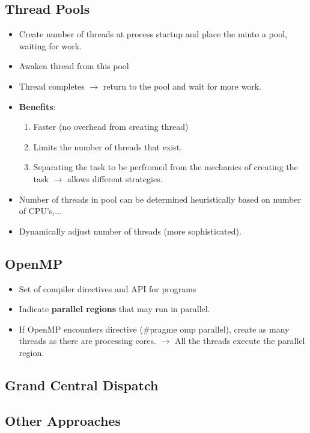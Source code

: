 \documentclass[10pt]{report}
\begin{document}
		\subsection{Thread Pools}
			\begin{itemize}
				\item Create number of threads at process startup and place the minto a pool, waiting for work.
				\item Awaken thread from this pool
				\item Thread completes $\rightarrow$ return to the pool and wait for more work.
				\item \textbf{Benefits}:
				\begin{enumerate}
					\item Faster (no overhead from creating thread)
					\item Limits the number of threads that exist.
					\item Separating the task to be perfromed from the mechanics of creating the task $\rightarrow$ allows different strategies.
				\end{enumerate}
				\item Number of threads in pool can be determined heuristically based on number of CPU's,...
				\item Dynamically adjust number of threads (more sophisticated).
			\end{itemize}

		\subsection{OpenMP}
			\begin{itemize}
				\item Set of compiler directives and API for programs
				\item Indicate \textbf{parallel regions} that may run in parallel.
				\item If OpenMP encounters directive (\#pragme omp parallel), create as many threads as there are processing cores. $\rightarrow$ All the threads execute the parallel region.
			\end{itemize}

		\subsection{Grand Central Dispatch}

		\subsection{Other Approaches}
\end{document}
